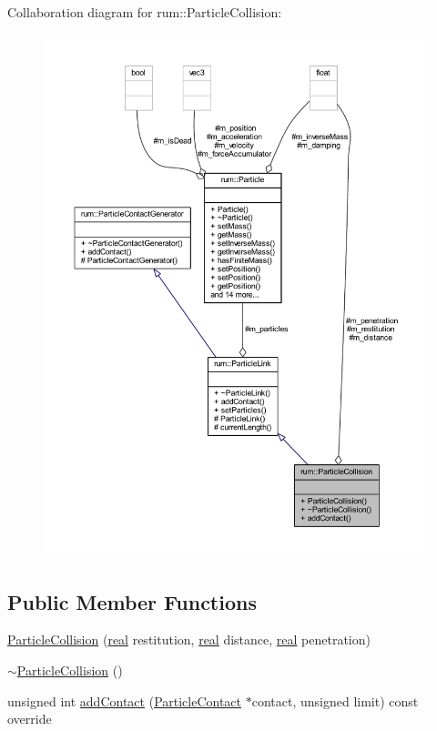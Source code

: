 Collaboration diagram for rum\+:\+:Particle\+Collision\+:\nopagebreak
\begin{figure}[H]
\begin{center}
\leavevmode
\includegraphics[width=350pt]{classrum_1_1_particle_collision__coll__graph}
\end{center}
\end{figure}
\subsection*{Public Member Functions}
\begin{DoxyCompactItemize}
\item 
\mbox{\hyperlink{classrum_1_1_particle_collision_a56570896eab4c089fd3df8fa6e96454c}{Particle\+Collision}} (\mbox{\hyperlink{namespacerum_a7e8cca23573d5eaead0f138cbaa4862c}{real}} restitution, \mbox{\hyperlink{namespacerum_a7e8cca23573d5eaead0f138cbaa4862c}{real}} distance, \mbox{\hyperlink{namespacerum_a7e8cca23573d5eaead0f138cbaa4862c}{real}} penetration)
\item 
\mbox{\hyperlink{classrum_1_1_particle_collision_afad930c6a0755e28c2bbca80cc7b5759}{$\sim$\+Particle\+Collision}} ()
\item 
unsigned int \mbox{\hyperlink{classrum_1_1_particle_collision_a0f935f8f4093623ea52a6fcbb902b2a4}{add\+Contact}} (\mbox{\hyperlink{classrum_1_1_particle_contact}{Particle\+Contact}} $\ast$contact, unsigned limit) const override
\end{DoxyCompactItemize}
